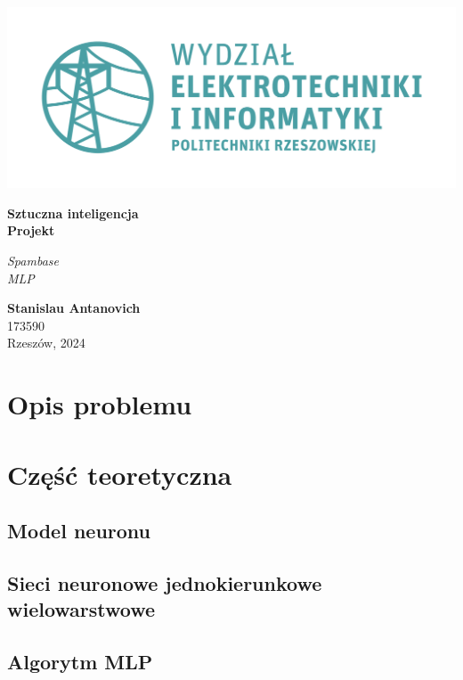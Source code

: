 \documentclass[a4paper, 10pt]{article}
\begin{document}
\begin{titlepage}
\begin{center}
	\includegraphics[scale=0.7]{logo.png}

	\vspace*{4cm}
	\textbf{Sztuczna inteligencja\\ Projekt}

	\vspace{1.5cm}
	\textit{Spambase\\MLP}

	\vspace{1.5cm}
	\textbf{Stanislau Antanovich}\\
	173590\\

	\vspace{6.5cm}
	Rzeszów, 2024
\end{center}
\end{titlepage}

\tableofcontents

\listoffigures


\newpage

\section{Opis problemu}

\section{Część teoretyczna}
\subsection{Model neuronu}
\subsection{Sieci neuronowe jednokierunkowe wielowarstwowe}
\subsection{Algorytm MLP}
\end{document}
